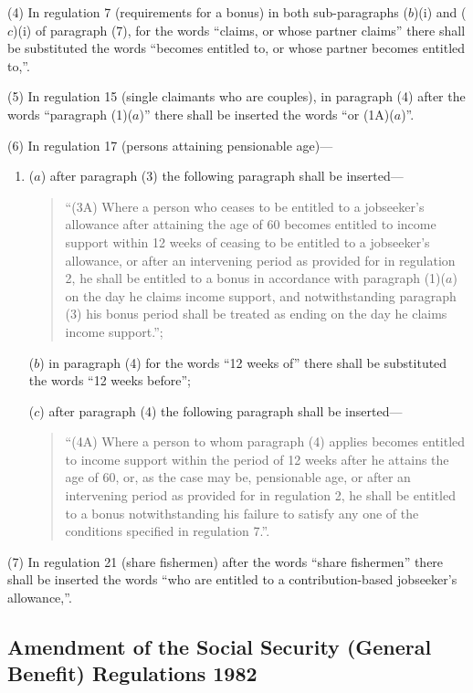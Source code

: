 \documentclass[12pt,a4paper]{article}
\begin{document}
(4) In regulation 7 (requirements for a bonus) in both sub-paragraphs ($b$)(i) and ($c$)(i) of paragraph (7), for the words “claims, or whose partner claims” there shall be substituted the words “becomes entitled to, or whose partner becomes entitled to,”.

(5) In regulation 15 (single claimants who are couples), in paragraph (4) after the words “paragraph (1)($a$)” there shall be inserted the words “or (1A)($a$)”.

(6) In regulation 17 (persons attaining pensionable age)—
\begin{enumerate}\item[]
($a$) after paragraph (3) the following paragraph shall be inserted—
\begin{quotation}
“(3A) Where a person who ceases to be entitled to a jobseeker’s allowance after attaining the age of 60 becomes entitled to income support within 12 weeks of ceasing to be entitled to a jobseeker’s allowance, or after an intervening period as provided for in regulation 2, he shall be entitled to a bonus in accordance with paragraph (1)($a$) on the day he claims income support, and notwithstanding paragraph (3) his bonus period shall be treated as ending on the day he claims income support.”;
\end{quotation}

($b$) in paragraph (4) for the words “12 weeks of” there shall be substituted the words “12 weeks before”;

($c$) after paragraph (4) the following paragraph shall be inserted—
\begin{quotation}
“(4A) Where a person to whom paragraph (4) applies becomes entitled to income support within the period of 12 weeks after he attains the age of 60, or, as the case may be, pensionable age, or after an intervening period as provided for in regulation 2, he shall be entitled to a bonus notwithstanding his failure to satisfy any one of the conditions specified in regulation 7.”.
\end{quotation}
\end{enumerate}

(7) In regulation 21 (share fishermen) after the words “share fishermen” there shall be inserted the words “who are entitled to a contribution-based jobseeker’s allowance,”.

\subsection[5. Amendment of the Social Security (General Benefit) Regulations 1982]{Amendment of the Social Security (General Benefit) Regulations 1982}
\end{document}
